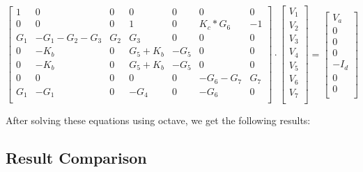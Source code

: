 \[
\begin{bmatrix}
1 & 0 & 0 & 0 & 0 & 0 & 0\\
0 & 0 & 0 & 1 & 0 & K_c * G_6 & -1\\
G_1 & -G_1-G_2 - G_3 & G_2 & G_3 & 0 & 0 & 0\\
0 & -K_b & 0 & G_5 + K_b & -G_5 & 0 & 0\\
0 & -K_b & 0 & G_5 + K_b & -G_5 & 0 & 0\\
0 & 0 & 0 & 0 & 0 & -G_6-G_7 & G_7\\
G_1 & -G_1 & 0 & -G_4 & 0 & -G_6 & 0\\
\end{bmatrix}
\cdot
\begin{bmatrix}
V_1\\
V_2\\
V_3\\
V_4\\
V_5\\
V_6\\
V_7\\
\end{bmatrix}
=
\begin{bmatrix}
V_a\\
0\\
0\\
0\\
-I_d\\
0\\
0\\
\end{bmatrix}
\]

\vspace{0.5cm}

After solving these equations using octave, we get 
the following results:

\vspace{0.5cm}


\vspace{1.0cm}

\subsection{Result Comparison }
